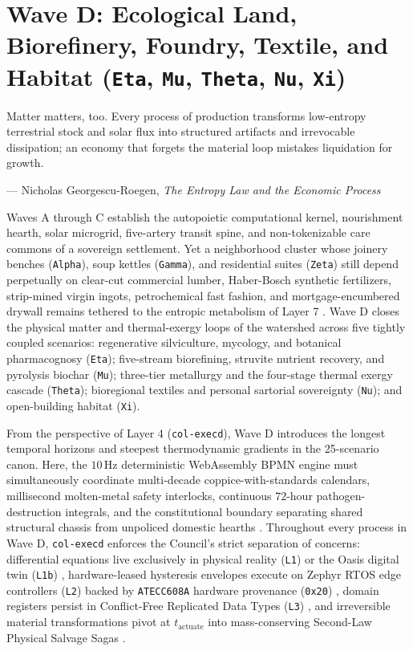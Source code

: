 \chapter{Wave D: Ecological Land, Biorefinery, Foundry, Textile, and Habitat (\texttt{Eta}, \texttt{Mu}, \texttt{Theta}, \texttt{Nu}, \texttt{Xi})}
\label{ch:wave-d}

\epigraph{Matter matters, too. Every process of production transforms low-entropy terrestrial stock and solar flux into structured artifacts and irrevocable dissipation; an economy that forgets the material loop mistakes liquidation for growth.}{--- Nicholas Georgescu-Roegen, \textit{The Entropy Law and the Economic Process} \parencite{georgescu1971}}

Waves A through C establish the autopoietic computational kernel, nourishment hearth, solar microgrid, five-artery transit spine, and
non-tokenizable care commons of a sovereign settlement. Yet a neighborhood cluster whose joinery benches (\texttt{Alpha}), soup kettles
(\texttt{Gamma}), and residential suites (\texttt{Zeta}) still depend perpetually on clear-cut commercial lumber, Haber-Bosch synthetic
fertilizers, strip-mined virgin ingots, petrochemical fast fashion, and mortgage-encumbered drywall remains tethered to the entropic metabolism
of Layer 7 \parencite{georgescu1971,odum1971}. Wave D closes the physical matter and thermal-exergy loops of the watershed across five tightly
coupled scenarios: regenerative silviculture, mycology, and botanical pharmacognosy (\texttt{Eta}); five-stream biorefining, struvite nutrient
recovery, and pyrolysis biochar (\texttt{Mu}); three-tier metallurgy and the four-stage thermal exergy cascade (\texttt{Theta}); bioregional
textiles and personal sartorial sovereignty (\texttt{Nu}); and open-building habitat (\texttt{Xi}).

From the perspective of Layer 4 (\texttt{col-execd}), Wave D introduces the longest temporal horizons and steepest thermodynamic gradients in the
25-scenario canon. Here, the $10\,\mathrm{Hz}$ deterministic WebAssembly BPMN engine \parencite{omg2011bpmn,haas2017wasm} must simultaneously
coordinate multi-decade coppice-with-standards calendars, millisecond molten-metal safety interlocks, continuous $72\text{-hour}$
pathogen-destruction integrals, and the constitutional boundary separating shared structural chassis from unpoliced domestic hearths
\parencite{habraken1972supports}. Throughout every process in Wave D, \texttt{col-execd} enforces the Council's strict separation of concerns:
differential equations live exclusively in physical reality (\texttt{L1}) or the Oasis digital twin (\texttt{L1b})
\parencite{grieves2014digital}, hardware-leased hysteresis envelopes execute on Zephyr RTOS edge controllers (\texttt{L2}) \parencite{zephyr2024}
backed by \texttt{ATECC608A} hardware provenance (\texttt{0x20}) \parencite{microchip_atecc608a}, domain registers persist in Conflict-Free
Replicated Data Types (\texttt{L3}) \parencite{shapiro2011crdt}, and irreversible material transformations pivot at $t_{\mathrm{actuate}}$ into
mass-conserving Second-Law Physical Salvage Sagas \parencite{garciamolina1987sagas}.

